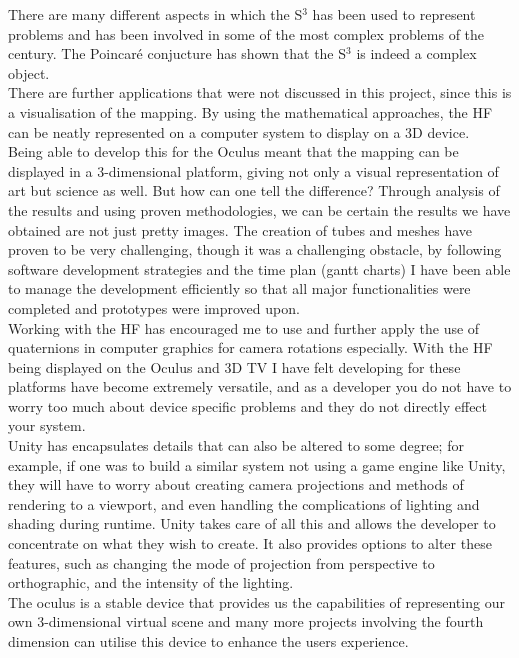 \documentclass[12pt]{article} %
\begin{document}
\begin{flushleft}
There are many different aspects in which the S$^{3}$ has been used to represent problems and has been involved in some of the most complex problems of the century. The Poincar\'e conjucture has shown that the S$^{3}$ is indeed a complex object. \\
There are further applications that were not discussed in this project, since this is a visualisation of the mapping. By using the mathematical approaches, the HF can be neatly represented on a computer system to display on a 3D device.\\
Being able to develop this for the Oculus meant that the mapping can be displayed in a 3-dimensional platform, giving not only a visual representation of art but science as well. But how can one tell the difference? Through analysis of the results and using proven methodologies, we can be certain the results we have obtained are not just pretty images.
The creation of tubes and meshes have proven to be very challenging, though it was a challenging obstacle, by following software development strategies and the time plan (gantt charts)  I have been able to manage the development efficiently so that all major functionalities were completed and prototypes were improved upon. \\
Working with the HF has encouraged me to use and further apply the use of quaternions in computer graphics for camera rotations especially. With the HF being displayed on the Oculus and 3D TV I have felt developing for these platforms have become extremely versatile, and as a developer you do not have to worry too much about device specific problems and they do not directly effect your system. \\ 
Unity has encapsulates details that can also be altered to some degree; for example, if one was to build a similar system not using a game engine like Unity, they will have to worry about creating camera projections and methods of rendering to a viewport, and even handling the complications of lighting and shading during runtime. Unity takes care of all this and allows the developer to concentrate on what they wish to create. It also provides options to alter these features, such as changing the mode of projection from perspective to orthographic, and the intensity of the lighting.\\
The oculus is a stable device that provides us the capabilities of representing our own 3-dimensional virtual scene and many more projects involving the fourth dimension can utilise this device to enhance the users experience.

\end{flushleft}
\end{document}
